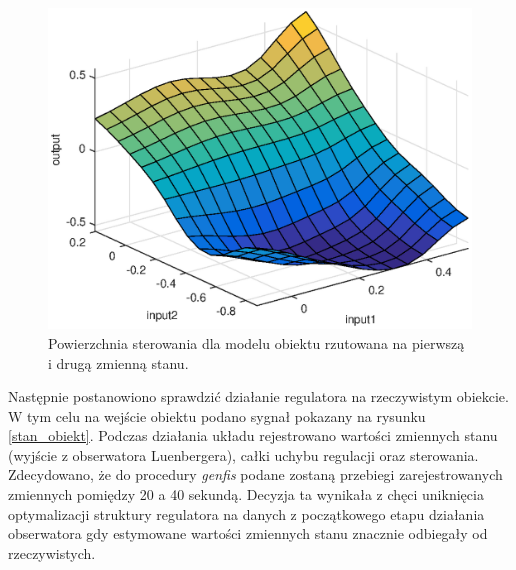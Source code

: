 
\begin{figure}[h!]
	\centering
	\includegraphics[scale = 0.8]{fig/fuzzy_hel_model_surf.eps}
	\caption		
	{Powierzchnia sterowania dla modelu obiektu rzutowana na pierwszą i drugą zmienną stanu.}
	\label{fuzzy_hel_model_surf}
\end{figure} 
\FloatBarrier
Następnie postanowiono sprawdzić działanie regulatora na rzeczywistym obiekcie. W tym celu na wejście obiektu podano sygnał pokazany na rysunku \ref{stan_obiekt}. Podczas działania układu rejestrowano wartości zmiennych stanu (wyjście z obserwatora Luenbergera), całki uchybu regulacji oraz sterowania.\\
Zdecydowano, że do procedury \textit{genfis} podane zostaną przebiegi zarejestrowanych zmiennych pomiędzy 20 a 40 sekundą. Decyzja ta wynikała z chęci uniknięcia optymalizacji struktury regulatora na danych z początkowego etapu działania obserwatora gdy estymowane wartości zmiennych stanu znacznie odbiegały od rzeczywistych. \\
